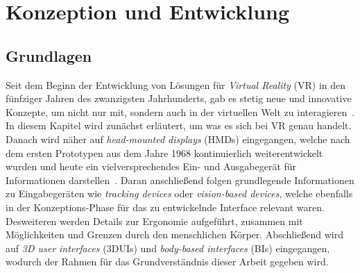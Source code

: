 \section{Konzeption und Entwicklung}

\subsection{Grundlagen}
Seit dem Beginn der Entwicklung von Lösungen für \textit{Virtual Reality} (VR) in den fünfziger Jahren des zwanzigsten Jahrhunderts, gab es stetig neue und innovative Konzepte, um nicht nur mit, sondern auch in der virtuellen Welt zu interagieren~\cite{virtualreality}. In diesem Kapitel wird zunächst erläutert, um was es sich bei VR genau handelt. Danach wird näher auf \textit{head-mounted displays} (HMDs) eingegangen, welche nach dem ersten Prototypen aus dem Jahre 1968 kontinuierlich weiterentwickelt wurden und heute ein vielversprechendes Ein- und Ausgabegerät für Informationen darstellen~\cite{vrfuture}. Daran anschließend folgen grundlegende Informationen zu Eingabegeräten wie \textit{tracking devices} oder \textit{vision-based devices}, welche ebenfalls in der Konzeptions-Phase für das zu entwickelnde Interface relevant waren. Desweiteren werden Details zur Ergonomie aufgeführt, zusammen mit Möglichkeiten und Grenzen durch den menschlichen Körper. Abschließend wird auf \textit{3D user interfaces} (3DUIs) und \textit{body-based interfaces} (BIs) eingegangen, wodurch der Rahmen für das Grundverständnis dieser Arbeit gegeben wird.

